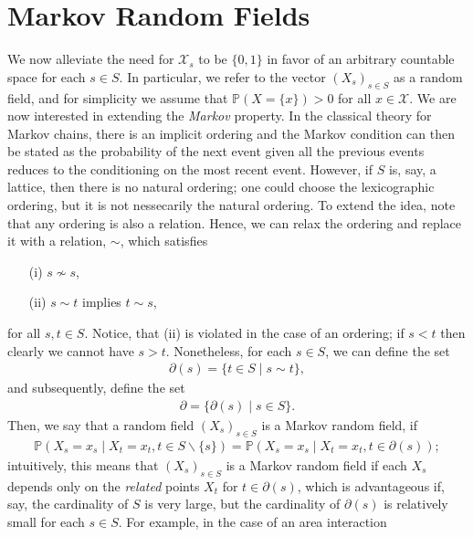 \documentclass{article}
\begin{document}
\section{Markov Random Fields}
We now alleviate the need for $\mathcal{X}_s$ to be $\{0,1\}$ in favor of an arbitrary countable space for each $s \in S$. \newline\newline
In particular, we refer to the vector $(X_s)_{s\in S}$ as a random field, and for simplicity we assume that $\mathbb{P}(X = \{x\}) > 0$ for all $x \in \mathcal{X}$. We are now interested in extending the \textit{Markov} property. In the classical theory for Markov chains, there is an implicit ordering and the Markov condition can then be stated as the probability of the next event given all the previous events reduces to the conditioning on the most recent event. However, if $S$ is, say, a lattice, then there is no natural ordering; one could choose the lexicographic ordering, but it is not nessecarily the natural ordering. \newline\newline
To extend the idea, note that any ordering is also a relation. Hence, we can relax the ordering and replace it with a relation, $\sim$, which satisfies 
\begin{itemize}
    \item[(i)] $s \not\sim s$, 
    \item[(ii)] $s \sim t$ implies $t \sim s$, 
\end{itemize}
for all $s,t \in S$. Notice, that (ii) is violated in the case of an ordering; if $s < t$ then clearly we cannot have $s > t$.\newline\newline
Nonetheless, for each $s \in S$, we can define the set 
\begin{align*}
    \partial(s) = \{t \in S \mid s \sim t\},
\end{align*}
and subsequently, define the set 
\begin{align*}
    \partial = \{\partial(s) \mid s \in S\}.
\end{align*}
Then, we say that a random field $(X_s)_{s \in S}$ is a Markov random field, if 
\begin{align*}
    \mathbb{P}(X_s = x_s \mid X_t = x_t, t \in S\backslash \{s\}) = \mathbb{P}(X_s = x_s \mid X_t = x_t, t \in \partial(s));
\end{align*}
intuitively, this means that $(X_s)_{s\in S}$ is a Markov random field if each $X_s$ depends only on the \textit{related} points $X_t$ for $t \in \partial(s)$, which is advantageous if, say, the cardinality of $S$ is very large, but the cardinality of $\partial(s)$ is relatively small for each $s \in S$.\newline\newline
For example, in the case of an area interaction 


%
\end{document}
